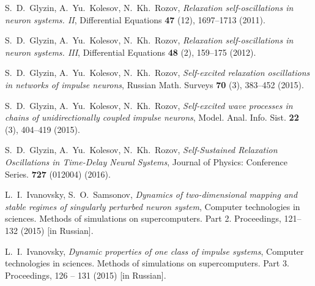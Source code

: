 \documentclass[12pt]{amsart}
\begin{document}
\begin{thebibliography}{20}

 S.~D.~Glyzin, A.~Yu.~Kolesov, N.~Kh.~Rozov,  
\textit{Relaxation self-oscillations in neuron systems. II},
Differential Equations \textbf{47} (12), 1697--1713 (2011). 

 S.~D.~Glyzin, A.~Yu.~Kolesov, N.~Kh.~Rozov,  
\textit{Relaxation self-oscillations in neuron systems. III},
Differential Equations \textbf{48} (2), 159--175 (2012).

 S.~D.~Glyzin, A.~Yu.~Kolesov, N.~Kh.~Rozov, 
\textit{Self-excited relaxation oscillations in networks of impulse neurons}, 
Russian Math. Surveys \textbf{70} (3), 383--452 (2015).

 S.~D.~Glyzin, A.~Yu.~Kolesov, N.~Kh.~Rozov,  
\textit{Self-excited wave processes in chains of unidirectionally coupled impulse neurons},
Model. Anal. Info. Sist. \textbf{22} (3), 404--419 (2015).

S.~D.~Glyzin, A.~Yu.~Kolesov, N.~Kh.~Rozov, 
\textit{Self-Sustained Relaxation Oscillations in Time-Delay Neural Systems}, 
Journal of Physics: Conference Series. \textbf{727} (012004) (2016).

 L.~I.~Ivanovsky, S.~O.~Samsonov,  
\textit{Dynamics of two-dimensional mapping and stable regimes of singularly perturbed neuron system},
Computer technologies in sciences. Methods of simulations on supercomputers. Part 2. Proceedings, 121--132 (2015) [in Russian].

 L.~I.~Ivanovsky, 
\textit{Dynamic properties of one class of impulse systems},
Computer technologies in sciences. Methods of simulations on supercomputers. Part 3. Proceedings, 126 -- 131 (2015) [in Russian].

\end{thebibliography}
\end{document}
